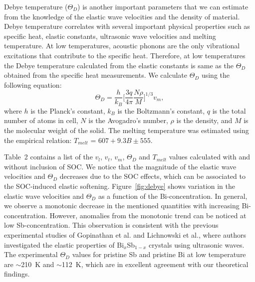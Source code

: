 \documentclass[twocolumn,superscriptaddress,nofootinbib,floatfix,aps,showpacs,prb,citeautoscript,reprint]{revtex4-1}
\begin{document}
Debye temperature ($\Theta_{D}$) is another important parameters that we can estimate from the knowledge of the elastic wave velocities and the density of material. Debye temperature correlates with several important physical properties such as specific heat, elastic constants, ultrasonic wave velocities and melting temperature. At low temperatures, acoustic phonons are the only vibrational excitations that contribute to the specific heat. Therefore, at low temperatures the Debye temperature calculated from the elastic constants is same as the $\Theta_D$ obtained from the specific heat measurements. We calculate $\Theta_D$ using the following equation: \cite{ANDERSON1962}
\begin{equation}
\Theta_D = {\frac{h}{k_B}\bigg[\frac{3q}{4{\pi}}\frac{N\rho}{M} \bigg]^{1/3}}v_m,
\end{equation}
where $h$ is the Planck's constant, $k_B$ is the Boltzmann's constant, $q$ is the total number of atoms in cell, $N$ is the Avogadro's number, $\rho$ is the density, and $M$ is the molecular weight of the solid. The melting temperature was estimated using the empirical relation: $T_{melt}$ = $607 + 9.3B \pm 555$. \cite{Johnston1996}

Table~2 contains a list of the $v_l$, $v_t$, $v_m$, $\Theta_D$ and $T_{melt}$ values calculated with and without inclusion of SOC. We notice that the magnitude of the elastic wave velocities and $\Theta_D$ decreases due to the SOC effects, which can be associated to the SOC-induced elastic softening. Figure~\ref{fig:debye} shows variation in the elastic wave velocities and $\Theta_D$ as a function of the Bi-concentration. In general, we observe a monotonic decrease in the mentioned quantities with increasing Bi-concentration. However, anomalies from the monotonic trend can be noticed at low Sb-concentration. This observation is consistent with the previous experimental studies of Gopinathan et al.\cite{Gopinathan1974} and  Lichnowski et al.\cite{Lichnowski1976}, where authors investigated the elastic properties of Bi$_{x}$Sb$_{1-x}$ crystals using ultrasonic waves. The experimental $\Theta_D$ values for pristine Sb and pristine Bi at low temperature are $\sim$210~K and $\sim$112~K, which are in excellent agreement with our theoretical findings. 
\end{document}
